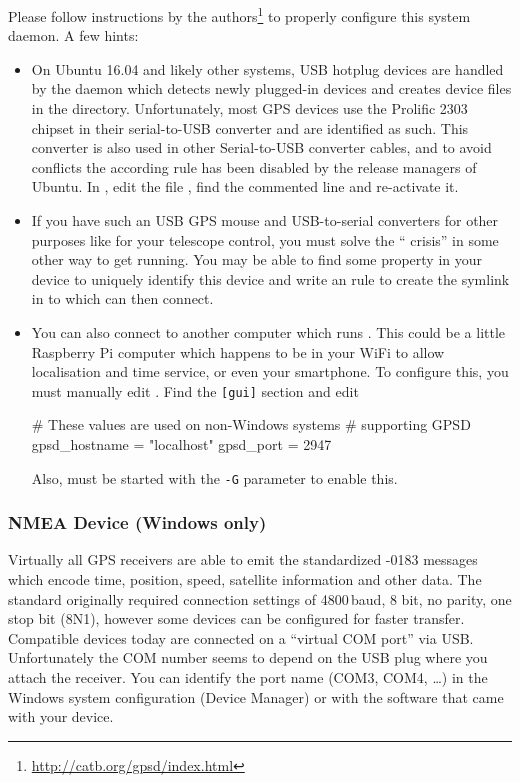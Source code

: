 Please follow instructions by the  authors\footnote{\url{http://catb.org/gpsd/index.html}} to properly configure this system daemon.
A few hints: 
\begin{itemize}
\item On Ubuntu 16.04 and likely other systems, USB hotplug devices are handled by the  daemon which detects newly plugged-in 
devices and creates device files in the  directory. Unfortunately, most GPS devices use the Prolific 2303 
chipset in their serial-to-USB converter and are identified as such. This converter is also used in other Serial-to-USB converter cables, 
and to avoid conflicts the according rule has been disabled by the release managers of Ubuntu.  In ,
edit the file , find the commented  line and re-activate it. 

\item If you have such an USB GPS mouse and USB-to-serial converters for other purposes like for your telescope control, you must solve 
the `` crisis'' in some other way to get  running. You may be able to find some property in your device to uniquely identify this device and 
write an  rule to create the symlink in  to which  can then connect. 

\item You can also connect to another computer which runs . This could be a little Raspberry Pi computer which happens 
to be in your WiFi to allow localisation and time service, or even your smartphone.  
To configure this, you must manually edit . Find the \texttt{[gui]} section and edit
\begin{configfile}
[gui]
# These values are used on non-Windows systems 
# supporting GPSD
gpsd_hostname   = "localhost"
gpsd_port       = 2947 
\end{configfile}
Also,  must be started with the \texttt{-G} parameter to enable this.
\end{itemize}

\subsubsection{NMEA Device (Windows only)}
\label{sec:ExtraData:GPS:NMEA}

Virtually all GPS receivers are able to emit the standardized -0183 messages which encode time, position, speed, satellite information and other data. 
The standard originally required connection settings of 4800\,baud, 8 bit, no parity, one stop bit (8N1), however some devices can be configured for faster transfer.
Compatible devices today are connected on a ``virtual COM port'' via USB. Unfortunately the COM number seems to depend on the USB plug where you attach the receiver. 
You can identify the port name (COM3, COM4, \ldots) in the Windows system configuration (Device Manager) or with the software that came with your device.

